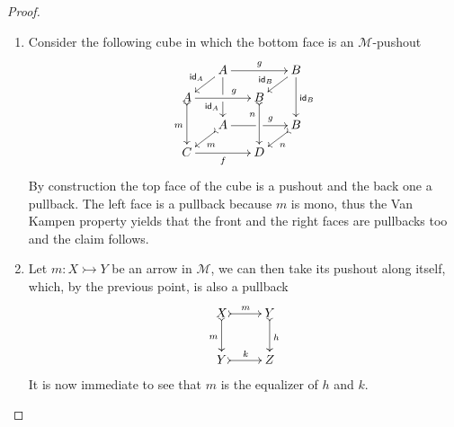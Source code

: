 \documentclass[3p]{elsarticle}
\def\C{\textbf {\textup{C}}}
\newcommand{\mto}{\rightarrowtail}
\newcommand{\id}[1]{\mathsf{id}_{#1}}
\theoremstyle{remark}
\theoremstyle{definition}
\begin{document}
\regmono*
\begin{proof}\label{regmono-proof}
	\begin{enumerate}
		\item  Consider the following cube in which the bottom face is an $\mathcal{M}$-pushout
		\[\xymatrix@C=15pt@R=9pt{&A\ar[dd]|\hole_(.65){\id{A}}\ar[rr]^{g} \ar[dl]_{\id{A}} && B \ar[dd]^{\id{B}} \ar[dl]_(.6){\id{B}} \\ A  \ar@{>->}[dd]_{m}\ar[rr]^(.65){g} & & B \ar@{>->}[dd]_(.3){n}\\&A\ar[rr]|\hole^(.65){g} \ar@{>->}[dl]^{m} && B \ar@{>->}[dl]^{n} \\C \ar[rr]_{f} & & D}\]
		By construction the top face of the cube is a pushout and the back one a pullback. The left face is a pullback because $m$ is mono, thus the Van Kampen property yields that the front and the right faces are pullbacks too and the claim follows.
		\item Let $m\colon X\mto Y$ be an arrow in $\mathcal{M}$, we can then take its pushout along itself, which, by the previous point, is also a pullback
		\[\xymatrix{X \ar@{>->}[r]^{m} \ar@{>->}[d]_{m}& Y \ar@{>->}[d]^{h}\\ Y \ar@{>->}[r]^{k} & Z}\]
		It is now immediate to see that $m$ is the equalizer of $h$ and $k$.   \qedhere
	\end{enumerate}
\end{proof}
\end{document}
